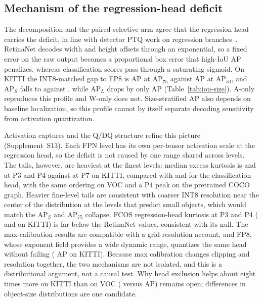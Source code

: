 \documentclass[a4paper,fleqn]{cas-dc}
\newcommand{\Jclean}{\mathrm{J95}}
\begin{document}
\subsection{Mechanism of the regression-head deficit}

\begin{table}[t]
\centering
\caption{AP by IoU threshold and object size, RetinaNet, $\Jclean$ basis (single runs). W-only: INT8 head weights, fp16 head activations; A-only: the reverse. Bold: AP$_{75}$ and AP$_S$ of the arms with INT8 head activations, where the deficit concentrates.}
\label{tab:iou-size}
\footnotesize
{\setlength{\tabcolsep}{3.5pt}}
\end{table}

The decomposition and the paired selective arm agree that the regression head carries the deficit, in line with detector PTQ work on regression branches~\citep{ding2024regptq}. RetinaNet decodes width and height offsets through an exponential, so a fixed error on the raw output becomes a proportional box error that high-IoU AP penalizes, whereas classification scores pass through a saturating sigmoid. On KITTI the INT8-matched gap to FP8 is \nnIouGapSeventyFiveKitti{} AP at $\mathrm{AP}_{75}$ against \nnIouGapFiftyKitti{} AP at $\mathrm{AP}_{50}$, and $\mathrm{AP}_S$ falls to \nnIouApSmallInKitti{} against \nnIouApSmallFeKitti{}, while $\mathrm{AP}_L$ drops by only \nnIouGapLargeKitti{} AP (Table~\ref{tab:iou-size}). A-only reproduces this profile and W-only does not. Size-stratified AP also depends on baseline localization, so this profile cannot by itself separate decoding sensitivity from activation quantization.

Activation captures and the Q/DQ structure refine this picture (Supplement~S13). Each FPN level has its own per-tensor activation scale at the regression head, so the deficit is not caused by one range shared across levels. The tails, however, are heaviest at the finest levels: median excess kurtosis is \nnActRegKurtPThreeKitti{} and \nnActRegKurtPFourKitti{} at P3 and P4 against \nnActRegKurtPSevenKitti{} at P7 on KITTI, compared with \nnActClsKurtPThreeKitti{} and \nnActClsKurtPFourKitti{} for the classification head, with the same ordering on VOC and a P4 peak on the pretrained COCO graph. Heavier fine-level tails are consistent with coarser INT8 resolution near the center of the distribution at the levels that predict small objects, which would match the $\mathrm{AP}_S$ and $\mathrm{AP}_{75}$ collapse. FCOS regression-head kurtosis at P3 and P4 (\nnActRegKurtPThreeFcosKitti{} and \nnActRegKurtPFourFcosKitti{} on KITTI) is far below the RetinaNet values, consistent with its null. The max-calibration results are compatible with a grid-resolution account, and FP8, whose exponent field provides a wide dynamic range, quantizes the same head without failing (\nnArmFeCleanKitti{} AP on KITTI). Because max calibration changes clipping and resolution together, the two mechanisms are not isolated, and this is a distributional argument, not a causal test. Why head exclusion helps about eight times more on KITTI than on VOC (\nnSelGainJKitti{} versus \nnSelGainJVoc{} AP) remains open; differences in object-size distributions are one candidate.
\end{document}
